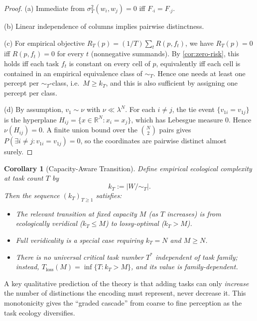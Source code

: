 \documentclass[12pt]{article}
\newtheorem{corollary}[theorem]{Corollary}
\newcommand{\sigmasq}{\sigma^2}
\newcommand{\R}{\mathbb{R}}
\begin{document}
\begin{proof}
(a) Immediate from $\sigmasq_T(w_i, w_j) = 0$ iff $F_{\cdot i} = F_{\cdot j}$.

(b) Linear independence of columns implies pairwise distinctness.

(c) For empirical objective $R_T(p) = (1/T)\sum_t R(p, f_t)$, we have $R_T(p) = 0$ iff $R(p, f_t) = 0$ for every $t$ (nonnegative summands). By \cref{cor:zero-risk}, this holds iff each task $f_t$ is constant on every cell of $p$, equivalently iff each cell is contained in an empirical equivalence class of ${\sim_T}$. Hence one needs at least one percept per ${\sim_T}$-class, i.e.\ $M \ge k_T$, and this is also sufficient by assigning one percept per class.

(d) By assumption, $v_1 \sim \nu$ with $\nu \ll \lambda^N$. For each $i \ne j$, the tie event $\{v_{1i} = v_{1j}\}$ is the hyperplane $H_{ij} = \{x \in \R^N : x_i = x_j\}$, which has Lebesgue measure $0$. Hence $\nu(H_{ij}) = 0$. A finite union bound over the $\binom{N}{2}$ pairs gives $P(\exists i \ne j: v_{1i} = v_{1j}) = 0$, so the coordinates are pairwise distinct almost surely.
\end{proof}

\begin{corollary}[Capacity-Aware Transition]\label{cor:capacity}
Define empirical ecological complexity at task count $T$ by
\[
k_T := |W/{\sim_T}|.
\]
Then the sequence $(k_T)_{T \ge 1}$ satisfies:
\begin{itemize}
\item The relevant transition at fixed capacity $M$ (as $T$ increases) is from \emph{ecologically veridical} ($k_T \le M$) to \emph{lossy-optimal} ($k_T > M$).
\item Full veridicality is a special case requiring $k_T = N$ and $M \ge N$.
\item There is no universal critical task number $T^*$ independent of task family; instead, $T_{\mathrm{loss}}(M) = \inf\{T : k_T > M\}$, and its value is family-dependent.
\end{itemize}
\end{corollary}

A key qualitative prediction of the theory is that adding tasks can only \emph{increase} the number of distinctions the encoding must represent, never decrease it. This monotonicity gives the ``graded cascade'' from coarse to fine perception as the task ecology diversifies.
\end{document}
